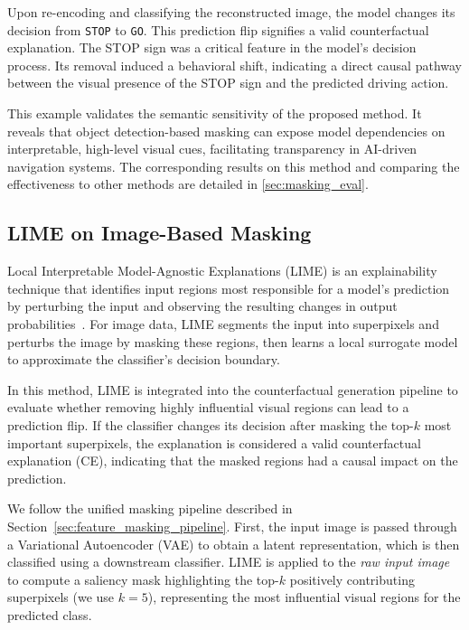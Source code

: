Upon re-encoding and classifying the reconstructed image, the model changes its decision from \texttt{STOP} to \texttt{GO}. This prediction flip signifies a valid counterfactual explanation. The STOP sign was a critical feature in the model’s decision process. Its removal induced a behavioral shift, indicating a direct causal pathway between the visual presence of the STOP sign and the predicted driving action.

This example validates the semantic sensitivity of the proposed method. It reveals that object detection-based masking can expose model dependencies on interpretable, high-level visual cues, facilitating transparency in AI-driven navigation systems. The corresponding results on this method and comparing the effectiveness to other methods are detailed in \cref{sec:masking_eval}.





\subsection{LIME on Image-Based Masking}
\label{sec:lime_on_images}

Local Interpretable Model-Agnostic Explanations (LIME) is an explainability technique that identifies input regions most responsible for a model’s prediction by perturbing the input and observing the resulting changes in output probabilities~\cite{Ribeiro2018}. For image data, LIME segments the input into superpixels and perturbs the image by masking these regions, then learns a local surrogate model to approximate the classifier’s decision boundary.

In this method, LIME is integrated into the counterfactual generation pipeline to evaluate whether removing highly influential visual regions can lead to a prediction flip. If the classifier changes its decision after masking the top-$k$ most important superpixels, the explanation is considered a valid counterfactual explanation (CE), indicating that the masked regions had a causal impact on the prediction.

We follow the unified masking pipeline described in Section~\ref{sec:feature_masking_pipeline}. First, the input image is passed through a Variational Autoencoder (VAE) to obtain a latent representation, which is then classified using a downstream classifier. LIME is applied to the \emph{raw input image} to compute a saliency mask highlighting the top-$k$ positively contributing superpixels (we use $k=5$), representing the most influential visual regions for the predicted class.

